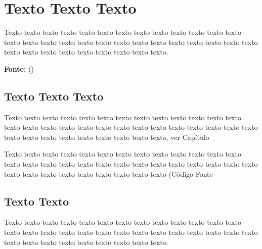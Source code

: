 \chapter{Texto Texto Texto}

Texto texto texto texto texto texto texto texto texto texto texto texto texto texto texto texto texto texto texto texto texto texto texto texto texto texto texto texto texto texto texto texto texto texto texto texto.



\hfill
\begin{minipage}[t]{.65\textwidth}
\ABNTEXfontereduzida\selectfont\textbf{Fonte:} \citeauthor{universidadejava2020}  (\citeyear{universidadejava2020}) 
\end{minipage}




\section{Texto Texto Texto}
Texto texto texto texto texto texto texto texto texto texto texto texto texto texto texto texto texto texto texto texto texto texto texto texto texto texto texto texto texto texto texto texto texto texto texto texto, ver Capítulo %

Texto texto texto texto texto texto texto texto texto texto texto texto texto texto texto texto texto texto texto texto texto texto texto texto texto texto texto texto texto texto texto texto texto texto texto texto (Código Fonte %


\section{Texto Texto}

Texto texto texto texto texto texto texto texto texto texto texto texto texto texto texto texto texto texto texto texto texto texto texto texto texto texto texto texto texto texto texto texto texto texto texto texto.

